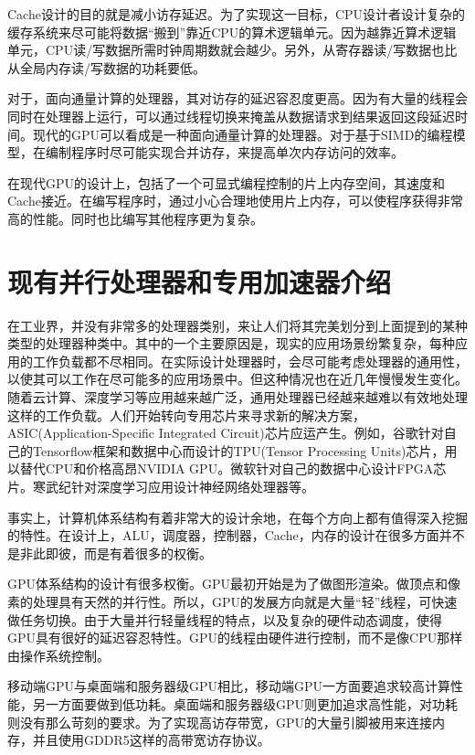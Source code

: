 Cache设计的目的就是减小访存延迟。为了实现这一目标，CPU设计者设计复杂的缓存系统来尽可能将数据“搬到”靠近CPU的算术逻辑单元。因为越靠近算术逻辑单元，CPU读/写数据所需时钟周期数就会越少。另外，从寄存器读/写数据也比从全局内存读/写数据的功耗要低。

对于，面向通量计算的处理器，其对访存的延迟容忍度更高。因为有大量的线程会同时在处理器上运行，可以通过线程切换来掩盖从数据请求到结果返回这段延迟时间。现代的GPU可以看成是一种面向通量计算的处理器。对于基于SIMD的编程模型，在编制程序时尽可能实现合并访存，来提高单次内存访问的效率。

在现代GPU的设计上，包括了一个可显式编程控制的片上内存空间，其速度和Cache接近。在编写程序时，通过小心合理地使用片上内存，可以使程序获得非常高的性能。同时也比编写其他程序更为复杂。



\section{现有并行处理器和专用加速器介绍}
在工业界，并没有非常多的处理器类别，来让人们将其完美划分到上面提到的某种类型的处理器种类中。其中的一个主要原因是，现实的应用场景纷繁复杂，每种应用的工作负载都不尽相同。在实际设计处理器时，会尽可能考虑处理器的通用性，以使其可以工作在尽可能多的应用场景中。但这种情况也在近几年慢慢发生变化。随着云计算、深度学习等应用越来越广泛，通用处理器已经越来越难以有效地处理这样的工作负载。人们开始转向专用芯片来寻求新的解决方案，ASIC(Application-Specific Integrated Circuit)芯片应运产生。例如，谷歌针对自己的Tensorflow框架和数据中心而设计的TPU(Tensor Processing Units)芯片，用以替代CPU和价格高昂NVIDIA GPU。微软针对自己的数据中心设计FPGA芯片。寒武纪针对深度学习应用设计神经网络处理器等。

事实上，计算机体系结构有着非常大的设计余地，在每个方向上都有值得深入挖掘的特性。在设计上，ALU，调度器，控制器，Cache，内存的设计在很多方面并不是非此即彼，而是有着很多的权衡。

GPU体系结构的设计有很多权衡。GPU最初开始是为了做图形渲染。做顶点和像素的处理具有天然的并行性。所以，GPU的发展方向就是大量“轻”线程，可快速做任务切换。由于大量并行轻量线程的特点，以及复杂的硬件动态调度，使得GPU具有很好的延迟容忍特性。GPU的线程由硬件进行控制，而不是像CPU那样由操作系统控制。

移动端GPU与桌面端和服务器级GPU相比，移动端GPU一方面要追求较高计算性能，另一方面要做到低功耗。桌面端和服务器级GPU则更加追求高性能，对功耗则没有那么苛刻的要求。为了实现高访存带宽，GPU的大量引脚被用来连接内存，并且使用GDDR5这样的高带宽访存协议。

